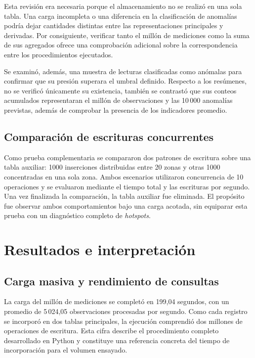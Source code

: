 \documentclass[conference]{IEEEtran}
\begin{document}
Esta revisión era necesaria porque el almacenamiento no se realizó en una sola tabla. Una carga incompleta o una diferencia en la clasificación de anomalías podría dejar cantidades distintas entre las representaciones principales y derivadas. Por consiguiente, verificar tanto el millón de mediciones como la suma de sus agregados ofrece una comprobación adicional sobre la correspondencia entre los procedimientos ejecutados.

 Se examinó, además, una muestra de lecturas clasificadas como anómalas para confirmar que su presión superara el umbral definido. Respecto a los resúmenes, no se verificó únicamente su existencia, también se contrastó que sus conteos acumulados representaran el millón de observaciones y las 10\,000 anomalías previstas, además de comprobar la presencia de los indicadores promedio.

\subsection{Comparación de escrituras concurrentes}

Como prueba complementaria se compararon dos patrones de escritura sobre una tabla auxiliar: 1000 inserciones distribuidas entre 20 zonas y otras 1000 concentradas en una sola zona. Ambos escenarios utilizaron concurrencia de 10 operaciones y se evaluaron mediante el tiempo total y las escrituras por segundo. Una vez finalizada la comparación, la tabla auxiliar fue eliminada. El propósito fue observar ambos comportamientos bajo una carga acotada, sin equiparar esta prueba con un diagnóstico completo de \textit{hotspots}.

\section{Resultados e interpretación}

\subsection{Carga masiva y rendimiento de consultas}

La carga del millón de mediciones se completó en 199,04 segundos, con un promedio de 5\,024,05 observaciones procesadas por segundo. Como cada registro se incorporó en dos tablas principales, la ejecución comprendió dos millones de operaciones de escritura. Esta cifra describe el procedimiento completo desarrollado en Python y constituye una referencia concreta del tiempo de incorporación para el volumen ensayado.
\end{document}
